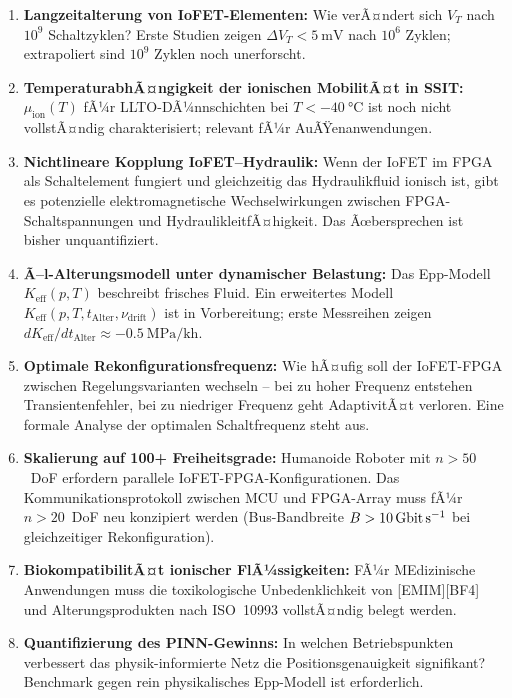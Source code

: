 ﻿\documentclass[a4paper,12pt]{scrreprt}
\theoremstyle{definition}
\begin{document}
\begin{enumerate}
  \item \textbf{Langzeitalterung von IoFET-Elementen:}
        Wie verÃ¤ndert sich $V_T$ nach $10^9$ Schaltzyklen?
        Erste Studien zeigen $\Delta V_T < \SI{5}{\milli\volt}$ nach
        $10^6$ Zyklen; extrapoliert sind $10^9$ Zyklen noch unerforscht.

  \item \textbf{TemperaturabhÃ¤ngigkeit der ionischen MobilitÃ¤t
        in SSIT:} $\mu_{\text{ion}}(T)$ fÃ¼r LLTO-DÃ¼nnschichten
        bei $T < \SI{-40}{\celsius}$ ist noch nicht vollstÃ¤ndig
        charakterisiert; relevant fÃ¼r AuÃŸenanwendungen.

  \item \textbf{Nichtlineare Kopplung IoFET--Hydraulik:}
        Wenn der IoFET im FPGA als Schaltelement fungiert und
        gleichzeitig das Hydraulikfluid ionisch ist, gibt es
        potenzielle elektromagnetische Wechselwirkungen
        zwischen FPGA-Schaltspannungen und HydraulikleitfÃ¤higkeit.
        Das Ãœbersprechen ist bisher unquantifiziert.

  \item \textbf{Ã–l-Alterungsmodell unter dynamischer Belastung:}
        Das Epp-Modell $K_{\text{eff}}(p,T)$ beschreibt frisches Fluid.
        Ein erweitertes Modell $K_{\text{eff}}(p,T,t_{\text{Alter}},\nu_{\text{drift}})$
        ist in Vorbereitung; erste Messreihen zeigen
        $dK_{\text{eff}}/dt_{\text{Alter}} \approx \SI{-0.5}{\mega\pascal\per\kilo\hour}$.

  \item \textbf{Optimale Rekonfigurationsfrequenz:}
        Wie hÃ¤ufig soll der IoFET-FPGA zwischen Regelungsvarianten
        wechseln -- bei zu hoher Frequenz entstehen Transientenfehler,
        bei zu niedriger Frequenz geht AdaptivitÃ¤t verloren.
        Eine formale Analyse der optimalen Schaltfrequenz steht aus.

  \item \textbf{Skalierung auf 100+ Freiheitsgrade:}
        Humanoide Roboter mit $n > 50$~DoF erfordern parallele
        IoFET-FPGA-Konfigurationen. Das Kommunikationsprotokoll
        zwischen MCU und FPGA-Array muss fÃ¼r $n > 20$~DoF
        neu konzipiert werden (Bus-Bandbreite $B > \SI{10}{\giga\bit\per\second}$
        bei gleichzeitiger Rekonfiguration).

  \item \textbf{BiokompatibilitÃ¤t ionischer FlÃ¼ssigkeiten:}
        FÃ¼r ME\-di\-zi\-ni\-sche Anwendungen muss die toxikologische
        Unbedenklichkeit von [EMIM][BF4] und Alterungsprodukten
        nach ISO~10993 vollstÃ¤ndig belegt werden.

  \item \textbf{Quantifizierung des PINN-Gewinns:}
        In welchen Betriebspunkten verbessert das physik-informierte
        Netz die Positionsgenauigkeit signifikant? Benchmark gegen
        rein physikalisches Epp-Modell ist erforderlich.
\end{enumerate}
\end{document}
